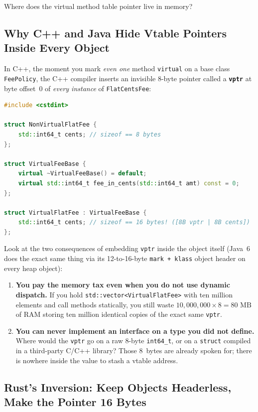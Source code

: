 Where does the virtual method table pointer live in memory?

\subsection{Why C++ and Java Hide Vtable Pointers Inside Every Object}

In C++, the moment you mark \emph{even one} method \texttt{virtual} on a base class \texttt{FeePolicy}, the C++ compiler inserts an invisible 8-byte pointer called a \textbf{\texttt{vptr}} at byte offset~0 of \emph{every instance} of \texttt{FlatCentsFee}:

\begin{lstlisting}[language=C++, caption={Adding virtual in C++ silently doubles the byte size of every FlatCentsFee instance from 8 bytes to 16 bytes.}]
#include <cstdint>

struct NonVirtualFlatFee {
    std::int64_t cents; // sizeof == 8 bytes
};

struct VirtualFeeBase {
    virtual ~VirtualFeeBase() = default;
    virtual std::int64_t fee_in_cents(std::int64_t amt) const = 0;
};

struct VirtualFlatFee : VirtualFeeBase {
    std::int64_t cents; // sizeof == 16 bytes! ([8B vptr | 8B cents])
};
\end{lstlisting}

Look at the two consequences of embedding \texttt{vptr} inside the object itself (Java~6 does the exact same thing via its 12-to-16-byte \texttt{mark + klass} object header on every heap object):

\begin{enumerate}
  \item \textbf{You pay the memory tax even when you do not use dynamic dispatch.} If you hold \texttt{std::vector<VirtualFlatFee>} with ten million elements and call methods statically, you still waste $10{,}000{,}000 \times 8 = 80\text{ MB}$ of RAM storing ten million identical copies of the exact same \texttt{vptr}.
  \item \textbf{You can never implement an interface on a type you did not define.} Where would the \texttt{vptr} go on a raw 8-byte \texttt{int64\_t}, or on a \texttt{struct} compiled in a third-party C/C++ library? Those 8~bytes are already spoken for; there is nowhere inside the value to stash a vtable address.
\end{enumerate}

\subsection{Rust's Inversion: Keep Objects Headerless, Make the Pointer 16 Bytes}

